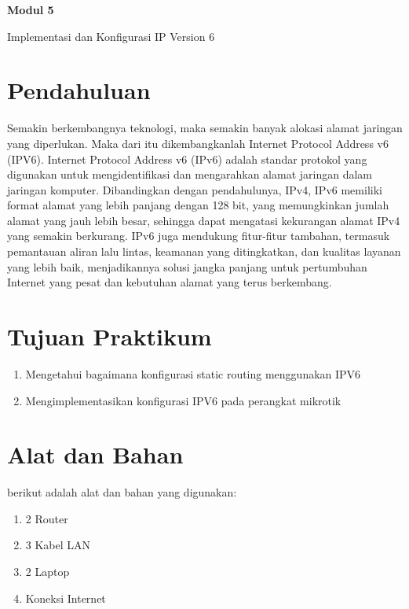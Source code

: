 \newpage
\setcounter{section}{0}
\renewcommand{\thesection}{\arabic{section}}

\begin{center}
    \Huge
    \textbf{Modul 5}
    
    Implementasi dan Konfigurasi IP Version 6

\end{center}


\section{Pendahuluan}

Semakin berkembangnya teknologi, maka semakin banyak alokasi alamat jaringan yang diperlukan. Maka dari itu dikembangkanlah Internet Protocol Address v6 (IPV6). Internet Protocol Address v6 (IPv6) adalah standar protokol yang digunakan untuk mengidentifikasi dan mengarahkan alamat jaringan dalam jaringan komputer. Dibandingkan dengan pendahulunya, IPv4, IPv6 memiliki format alamat yang lebih panjang dengan 128 bit, yang memungkinkan jumlah alamat yang jauh lebih besar, sehingga dapat mengatasi kekurangan alamat IPv4 yang semakin berkurang. IPv6 juga mendukung fitur-fitur tambahan, termasuk pemantauan aliran lalu lintas, keamanan yang ditingkatkan, dan kualitas layanan yang lebih baik, menjadikannya solusi jangka panjang untuk pertumbuhan Internet yang pesat dan kebutuhan alamat yang terus berkembang.

\section{Tujuan Praktikum}

\begin{enumerate}
    \item Mengetahui bagaimana konfigurasi static routing menggunakan IPV6
    \item Mengimplementasikan konfigurasi IPV6 pada perangkat mikrotik
\end{enumerate}

\section{Alat dan Bahan}

berikut adalah alat dan bahan yang digunakan:


\begin{enumerate}
    \item 2 Router
    \item 3 Kabel LAN
    \item 2 Laptop
    \item Koneksi Internet
\end{enumerate}

